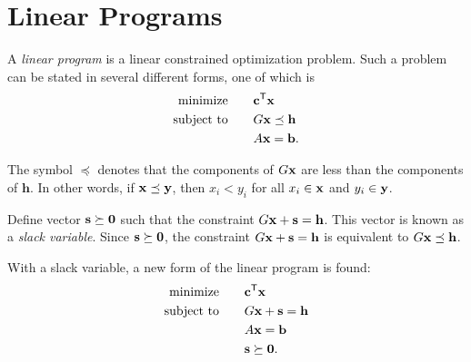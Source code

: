 
%

\section*{Linear Programs} %

A \emph{linear program} is a linear constrained optimization problem. Such a problem can be stated in several
different forms, one of which is
\begin{align*}
\text{minimize}\qquad &\mathbf{c}^{\mathsf T} \mathbf{x} \\
\text{subject to}\qquad &G\mathbf{x} \preceq \mathbf{h}\\
&A\mathbf{x} = \mathbf{b}.
\end{align*}

The symbol $\preceq$ denotes that the components of $G\mathbf{x}$ are less than the components of $\mathbf{h}$. In other words, if $\mathbf{x}\preceq\mathbf{y}$, then $x_i < y_i$ for all $x_i\in\mathbf{x}$ and $y_i\in\mathbf{y}$. 

Define vector $\mathbf{s} \succeq \mathbf{0}$ such that the constraint $G\mathbf{x} + \mathbf{s} = \mathbf{h}$. 
This vector is known as a \emph{slack variable}. 
Since $\mathbf{s} \succeq \mathbf{0}$, the constraint
$G\mathbf{x} + \mathbf{s} = \mathbf{h}$ is equivalent to $G\mathbf{x} \preceq \mathbf{h}$.

With a slack variable, a new form of the linear program is found:
\begin{align*}
\text{minimize}\qquad &\mathbf{c}^{\mathsf T} \mathbf{x} \\
\text{subject to}\qquad &G\mathbf{x} + \mathbf{s} = \mathbf{h}\\
&A\mathbf{x} = \mathbf{b} \\
&\mathbf{s} \succeq \mathbf{0}.
\end{align*}

